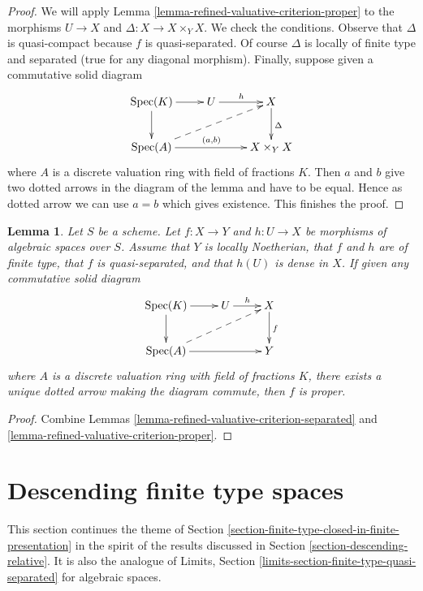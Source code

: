 \documentclass{stacks-project}
\theoremstyle{plain}
\newtheorem{lemma}[subsection]{Lemma}
\theoremstyle{definition}
\theoremstyle{remark}
\numberwithin{equation}{subsection}
\def\Spec{\mathop{\mathrm{Spec}}}
\begin{document}
\begin{proof}
We will apply Lemma \ref{lemma-refined-valuative-criterion-proper}
to the morphisms $U \to X$ and $\Delta : X \to X \times_Y X$.
We check the conditions. Observe that $\Delta$ is quasi-compact because
$f$ is quasi-separated. Of course $\Delta$ is locally of finite type and
separated (true for any diagonal morphism).
Finally, suppose given a commutative solid diagram
$$
\xymatrix{
\Spec(K) \ar[r] \ar[d] & U \ar[r]^h & X \ar[d]^\Delta \\
\Spec(A) \ar[rr]^{(a, b)} \ar@{-->}[rru] & & X \times_Y X
}
$$
where $A$ is a discrete valuation ring with field of fractions $K$.
Then $a$ and $b$ give two dotted arrows in the diagram of the lemma
and have to be equal. Hence as dotted arrow we can use $a = b$
which gives existence. This finishes the proof.
\end{proof}

\begin{lemma}
\label{lemma-refined-valuative-criterion-universally-closed}
Let $S$ be a scheme.
Let $f : X \to Y$ and $h : U \to X$ be morphisms of algebraic spaces over $S$.
Assume that $Y$ is locally Noetherian, that $f$ and $h$ are of finite type,
that $f$ is quasi-separated, and
that $h(U)$ is dense in $X$. If given any commutative solid diagram
$$
\xymatrix{
\Spec(K) \ar[r] \ar[d] & U \ar[r]^h & X \ar[d]^f \\
\Spec(A) \ar[rr] \ar@{-->}[rru] & & Y
}
$$
where $A$ is a discrete valuation ring with field of fractions $K$, there
exists a unique dotted arrow making the diagram commute, then $f$ is proper.
\end{lemma}

\begin{proof}
Combine Lemmas \ref{lemma-refined-valuative-criterion-separated} and
\ref{lemma-refined-valuative-criterion-proper}.
\end{proof}







\section{Descending finite type spaces}
\label{section-finite-type-quasi-separated}

\noindent
This section continues the theme of
Section \ref{section-finite-type-closed-in-finite-presentation}
in the spirit of the results discussed in
Section \ref{section-descending-relative}.
It is also the analogue of
Limits, Section \ref{limits-section-finite-type-quasi-separated}
for algebraic spaces.
\end{document}
